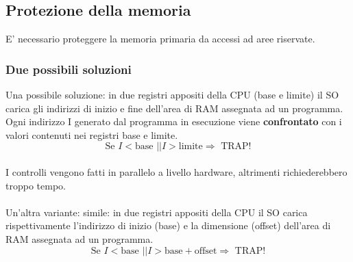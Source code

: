 
\subsection{Protezione della memoria}
E’ necessario proteggere la memoria primaria da accessi ad aree riservate.

\subsubsection{Due possibili soluzioni}
Una possibile soluzione: in due registri appositi della CPU (base e limite) il SO carica gli indirizzi di inizio e fine dell’area di RAM assegnata ad un programma.\\
Ogni indirizzo I generato dal programma in esecuzione viene \textbf{confrontato} con i valori contenuti nei registri base e limite. \\
$$\text{Se }I < \text{base } || I > \text{limite} \Longrightarrow \text{ TRAP!}$$ \\
I controlli vengono fatti in parallelo a livello hardware, altrimenti richiederebbero troppo tempo. \\\\

Un'altra variante: simile: in due registri appositi della CPU il SO carica rispettivamente l’indirizzo di inizio (base) e la dimensione (offset) dell’area di RAM assegnata ad un programma.
$$\text{Se } I < \text{base } || I > \text{base} + \text{offset} \Longrightarrow \text{ TRAP!}$$

